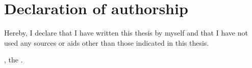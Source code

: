 \chapter*{Declaration of authorship}
\thispagestyle{empty}

\noindent Hereby, I declare that I have written this thesis by myself and that I have not used any sources or aids other than those indicated in this thesis.

\vspace*{1cm}

\noindent \getPrintLocationEN, the \getSubmissionDateEN.

\vspace*{2cm}
\par\noindent\makebox[2.5in]{\hspace*{-1pt}\dotfill}
\par\noindent\makebox[2.5in][l]{\getAuthor}
